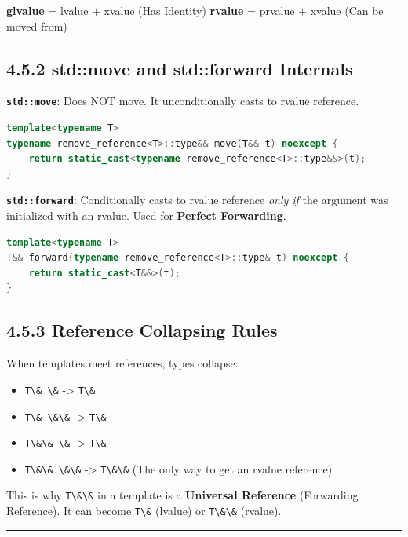 \textbf{glvalue} = lvalue + xvalue (Has Identity) \textbf{rvalue} =
prvalue + xvalue (Can be moved from)

\hypertarget{stdmove-and-stdforward-internals}{%
\subsection{4.5.2 std::move and std::forward
Internals}\label{stdmove-and-stdforward-internals}}

\textbf{\passthrough{\lstinline!std::move!}}: Does NOT move. It
unconditionally casts to rvalue reference.

\begin{lstlisting}[language={C++}]
template<typename T>
typename remove_reference<T>::type&& move(T&& t) noexcept {
    return static_cast<typename remove_reference<T>::type&&>(t);
}
\end{lstlisting}

\textbf{\passthrough{\lstinline!std::forward!}}: Conditionally casts to
rvalue reference \emph{only if} the argument was initialized with an
rvalue. Used for \textbf{Perfect Forwarding}.

\begin{lstlisting}[language={C++}]
template<typename T>
T&& forward(typename remove_reference<T>::type& t) noexcept {
    return static_cast<T&&>(t);
}
\end{lstlisting}

\hypertarget{reference-collapsing-rules}{%
\subsection{4.5.3 Reference Collapsing
Rules}\label{reference-collapsing-rules}}

When templates meet references, types collapse:

\begin{itemize}
\tightlist
\item
  \passthrough{\lstinline!T\& \&!} -\textgreater{}
  \passthrough{\lstinline!T\&!}
\item
  \passthrough{\lstinline!T\& \&\&!} -\textgreater{}
  \passthrough{\lstinline!T\&!}
\item
  \passthrough{\lstinline!T\&\& \&!} -\textgreater{}
  \passthrough{\lstinline!T\&!}
\item
  \passthrough{\lstinline!T\&\& \&\&!} -\textgreater{}
  \passthrough{\lstinline!T\&\&!} (The only way to get an rvalue
  reference)
\end{itemize}

This is why \passthrough{\lstinline!T\&\&!} in a template is a
\textbf{Universal Reference} (Forwarding Reference). It can become
\passthrough{\lstinline!T\&!} (lvalue) or
\passthrough{\lstinline!T\&\&!} (rvalue).

\begin{center}\rule{0.5\linewidth}{0.5pt}\end{center}
